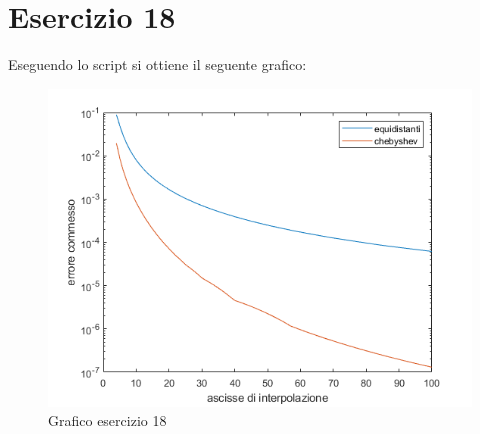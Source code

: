\section{Esercizio 18}

Eseguendo lo script si ottiene il seguente grafico:
\begin{figure}[h]
    \includegraphics[scale=0.8]{CodiceMatlab/Esercizio15-19/graficoEs18.png}
    \caption{Grafico esercizio 18}
    \label{fig:es18}    
\end{figure}